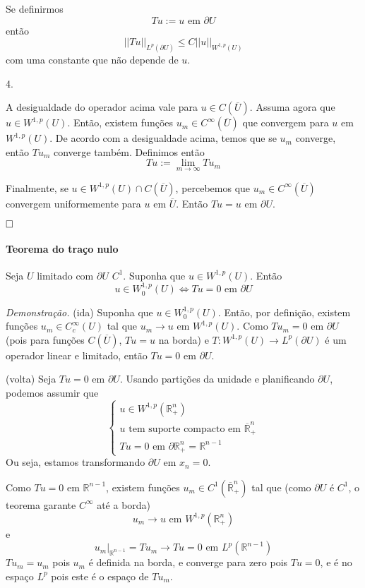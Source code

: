 \documentclass[a4paper, 11pt]{book}
\newcommand{\qed}{$\hfill\square$}
\newcommand{\R}{\mathbb{R}}
\newcommand{\p}{\partial}
\newcommand{\pu}{\partial U}
\begin{document}
Se definirmos \[ Tu := u \text{ em } \pu \] então \[ ||Tu||_{L^p(\pu)} \leq C ||u||_{W^{1,p}(U)} \] com uma constante que não depende de $u$.


4.

A desigualdade do operador acima vale para $u \in C(\overline{U})$. Assuma agora que $u \in W^{1,p}(U)$. Então, existem funções $u_m \in C^\infty (\overline{U})$ que convergem para $u$ em $W^{1,p}(U)$. De acordo com a desigualdade acima, temos que se $u_m$ converge, então $Tu_m$ converge também. Definimos então \[ Tu := \lim_{m\rightarrow \infty} Tu_m \] 

Finalmente, se $u \in W^{1,p}(U) \cap C(\overline{U})$, percebemos que $u_m \in C^\infty(\overline{U})$ convergem uniformemente para $u$ em $\overline{U}$. Então $Tu=u$ em $\pu$.

\qed






\paragraph{Teorema do traço nulo} Seja $U$ limitado com $\pu$ $C^1$. Suponha que $u \in W^{1,p}(U)$. Então \[ u \in W^{1,p}_0(U) \Leftrightarrow Tu =0 \text{ em } \pu \]

\textit{Demonstração.} (ida) Suponha que $ u \in W^{1,p}_0(U) $. Então, por definição, existem funções $ u_m \in C^\infty_c(U) $ tal que $ u_m\rightarrow u $ em $ W^{1,p}(U) $. Como $ Tu_m=0 $ em $ \pu $ (pois para funções $ C(\overline{U}) $, $ Tu=u $ na borda) e $ T:W^{1,p}(U)\rightarrow L^p(\pu) $ é um operador linear e limitado, então $ Tu=0 $ em $ \pu $.

(volta) Seja $ Tu=0 \text{ em } \pu $. Usando partições da unidade e planificando $ \pu $, podemos assumir que \[ \begin{cases}
	u \in W^{1,p}(\R^n_+) \\
	u \text{ tem suporte compacto em } \overline{\R}^n_+\\
	Tu=0 \text{ em } \p\R^n_+ = \R^{n-1}
\end{cases} \] Ou seja, estamos transformando $ \pu $ em $ {x_n=0} $.

Como $ Tu=0 $ em $ \R^{n-1} $, existem funções $ u_m \in C^1(\overline{\R}^n_+) $ tal que (como $\pu$ é $C^1$, o teorema garante $C^\infty$ até a borda) \[ u_m \rightarrow u  \text{ em } W^{1,p}(\R^n_+)\] e \[ u_m |_{\R^{n-1}} = Tu_m  \rightarrow Tu =0  \text{ em } L^p(\R^{n-1})\] $ Tu_m=u_m $ pois $ u_m $ é definida na borda, e converge para zero pois $Tu=0$, e é no espaço $ L^p $ pois este é o espaço de $ Tu_m $.
\end{document}
